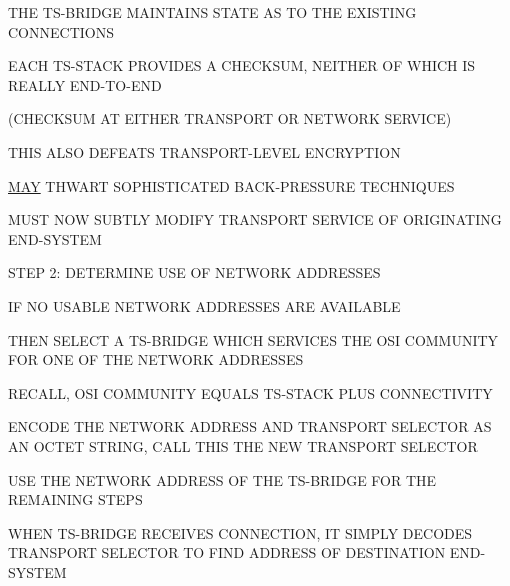 

\begin{bwslide}

\begin{nrtc}
\item	THE TS-BRIDGE MAINTAINS STATE AS TO THE EXISTING CONNECTIONS

\item	EACH TS-STACK PROVIDES A CHECKSUM,
	NEITHER OF WHICH IS REALLY END-TO-END
    \begin{nrtc}
    \item	(CHECKSUM AT EITHER TRANSPORT OR NETWORK SERVICE)
    \end{nrtc}

\item	THIS ALSO DEFEATS TRANSPORT-LEVEL ENCRYPTION

\item	\underline{MAY} THWART SOPHISTICATED BACK-PRESSURE TECHNIQUES
\end{nrtc}
\end{bwslide}


\begin{bwslide}

\begin{nrtc}
\item	MUST NOW SUBTLY MODIFY TRANSPORT SERVICE OF ORIGINATING END-SYSTEM
    \begin{nrtc}
    \item	STEP 2: DETERMINE USE OF NETWORK ADDRESSES
    \end{nrtc}

\item	IF NO USABLE NETWORK ADDRESSES ARE AVAILABLE

\item	THEN SELECT A TS-BRIDGE WHICH SERVICES THE OSI COMMUNITY FOR ONE OF
	THE NETWORK ADDRESSES
    \begin{nrtc}
    \item	 RECALL, OSI COMMUNITY EQUALS TS-STACK PLUS CONNECTIVITY
    \end{nrtc}
\end{nrtc}
\end{bwslide}


\begin{bwslide}

\begin{nrtc}
\item	ENCODE THE NETWORK ADDRESS AND TRANSPORT SELECTOR AS AN OCTET STRING,
	CALL THIS THE NEW TRANSPORT SELECTOR

\item	USE THE NETWORK ADDRESS OF THE TS-BRIDGE FOR THE REMAINING STEPS

\item	WHEN TS-BRIDGE RECEIVES CONNECTION,
	IT SIMPLY DECODES TRANSPORT SELECTOR TO FIND ADDRESS OF
	DESTINATION END-SYSTEM
\end{nrtc}
\end{bwslide}


